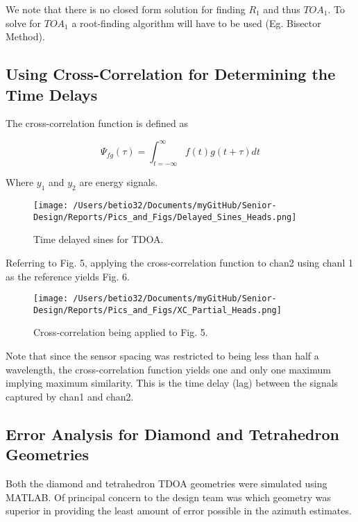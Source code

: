 \documentclass[12pt]{article}
\begin{document}
\noindent We note that there is no closed form solution for finding $R_1$ and thus $TOA_1$. To solve for $TOA_1$ a root-finding algorithm will have to be used (Eg. Bisector Method).

\subsection{Using Cross-Correlation for Determining the Time Delays}

\vspace{5 mm}
\noindent The cross-correlation function is defined as
\begin{center}
\begin{equation} \label{eq:29}
\Psi_{fg} (\tau) = \int_{t=-\infty}^{\infty} f(t) g(t+\tau) dt
\end{equation}
\end{center}

\vspace{5 mm}
\noindent Where $y_1$ and $y_2$ are energy signals.

\begin{figure}[!h]
	\centering
	\texttt{[image: /Users/betio32/Documents/myGitHub/Senior-Design/Reports/Pics\_and\_Figs/Delayed\_Sines\_Heads.png]}
    \caption{Time delayed sines for TDOA.} \label{fig:Delayed_Sines_Heads}
\end{figure}

\pagebreak
\noindent Referring to Fig. 5, applying the cross-correlation function to chan2 using chanl 1 as the reference yields Fig. 6.

\begin{figure}[!h]
	\centering
	\texttt{[image: /Users/betio32/Documents/myGitHub/Senior-Design/Reports/Pics\_and\_Figs/XC\_Partial\_Heads.png]}
    \caption{Cross-correlation being applied to Fig. 5.} \label{fig:XC_Partial_Heads}
\end{figure}

\noindent Note that since the sensor spacing was restricted to being less than half a wavelength, the cross-correlation function yields one and only one maximum implying maximum similarity. This is the time delay (lag) between the signals captured by chan1 and chan2.

\subsection{Error Analysis for Diamond and Tetrahedron Geometries}

\noindent Both the diamond and tetrahedron TDOA geometries were simulated using MATLAB. Of principal concern to the design team was which geometry was superior in providing the least amount of error possible in the azimuth estimates.\\
\end{document}
